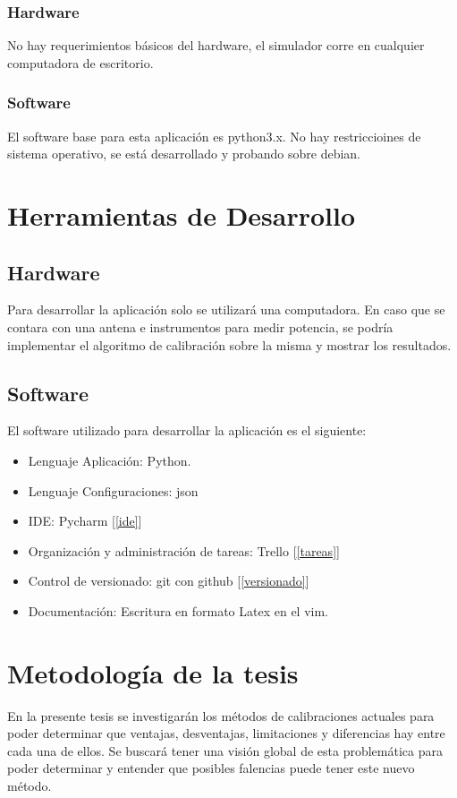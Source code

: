 \documentclass[a4paper,10pt]{article}
\begin{document}
\subsubsection{Hardware}

    No hay requerimientos básicos del hardware, el simulador corre en cualquier
computadora de escritorio. 

\subsubsection{Software}

    El software base para esta aplicación es python3.x. No hay restriccioines de
sistema operativo, se está desarrollado y probando sobre debian.

\section{Herramientas de Desarrollo}

\subsection{Hardware}

Para desarrollar la aplicación solo se utilizará una computadora. En caso que se
contara con una antena e instrumentos para medir potencia, se podría implementar
el algoritmo de calibración sobre la misma y mostrar los resultados. 

\subsection{Software}

El software utilizado para desarrollar la aplicación es el siguiente:
\begin{itemize}
    \item Lenguaje Aplicación: Python.
    \item Lenguaje Configuraciones: json
    \item IDE: Pycharm [\ref{ide}]
    \item Organización y administración de tareas: Trello [\ref{tareas}]
    \item Control de versionado: git con github [\ref{versionado}]
    \item Documentación: Escritura en formato Latex en el vim.
\end{itemize}   
    
	\section{Metodología de la tesis}
		En la presente tesis se investigarán los métodos de calibraciones 
	actuales para poder determinar que ventajas, desventajas, limitaciones y 
	diferencias hay entre cada una de ellos. Se buscará tener una visión global
	de esta problemática para poder determinar y entender que posibles falencias
	puede tener este nuevo método.
\end{document}
